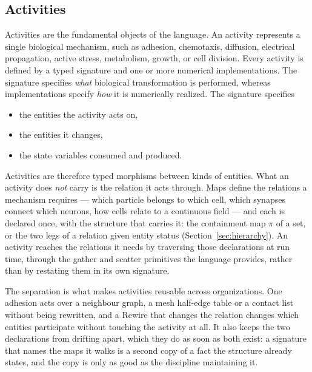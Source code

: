 \documentclass[11pt]{article}
\begin{document}
\subsection{Activities}

Activities are the fundamental objects of the language. An activity represents a
single biological mechanism, such as adhesion, chemotaxis, diffusion, electrical
propagation, active stress, metabolism, growth, or cell division. Every activity is
defined by a typed signature and one or more numerical implementations. The signature
specifies \emph{what} biological transformation is performed, whereas implementations
specify \emph{how} it is numerically realized. The signature specifies

\begin{itemize}
\item the entities the activity acts on,
\item the entities it changes,
\item the state variables consumed and produced.
\end{itemize}

Activities are therefore typed morphisms between kinds of entities. What an activity does
\emph{not} carry is the relation it acts through. Maps define the relations a mechanism
requires --- which particle belongs to which cell, which synapses connect which neurons, how
cells relate to a continuous field --- and each is declared once, with the structure that
carries it: the containment map $\pi$ of a set, or the two legs of a relation given entity
status (Section~\ref{sec:hierarchy}). An activity reaches the relations it needs by traversing
those declarations at run time, through the gather and scatter primitives the language
provides, rather than by restating them in its own signature.

The separation is what makes activities reusable across organizations. One adhesion acts over
a neighbour graph, a mesh half-edge table or a contact list without being rewritten, and a
Rewire that changes the relation changes which entities participate without touching the
activity at all. It also keeps the two declarations from drifting apart, which they do as soon
as both exist: a signature that names the maps it walks is a second copy of a fact the
structure already states, and the copy is only as good as the discipline maintaining it.

\end{document}
